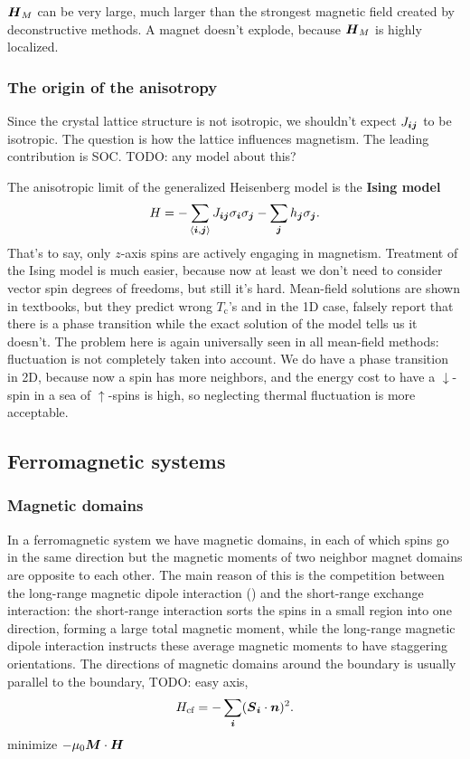 \documentclass[hyperref, a4paper]{article}
\newcommand*{\pair}[1]{\langle #1 \rangle}
\newcommand*{\concept}[1]{{\textbf{#1}}}
\newcommand*{\Tc}{T_{\text{c}}}
\begin{document}
$\vb*{H}_{M}$ can be very large,
much larger than the strongest magnetic field created 
by deconstructive methods.
A magnet doesn't explode, 
because $\vb*{H}_M$ is highly localized.

\subsubsection{The origin of the anisotropy}

Since the crystal lattice structure is not isotropic, 
we shouldn't expect $J_{\vb*{i} \vb*{j}}$ to be isotropic.
The question is how the lattice influences magnetism.
The leading contribution is SOC. TODO: any model about this?

The anisotropic limit of the generalized Heisenberg model is the \concept{Ising model}
\begin{equation}
    H = - \sum_{\pair{\vb*{i}, \vb*{j}}} J_{\vb*{i} \vb*{j}} \sigma_{\vb*{i}} \sigma_{\vb*{j}}
    - \sum_{\vb*{j}} h_{\vb*{j}} \sigma_{\vb*{j}}.
\end{equation}
That's to say, only $z$-axis spins are actively engaging in magnetism.
Treatment of the Ising model is much easier,
because now at least we don't need to consider vector spin degrees of freedoms,
but still it's hard. 
Mean-field solutions are shown in textbooks, 
but they predict wrong $\Tc$'s 
and in the 1D case, falsely report that there is a phase transition 
while the exact solution of the model tells us 
it doesn't. 
The problem here is again universally seen in all mean-field methods:
fluctuation is not completely taken into account. 
We do have a phase transition in 2D,
because now a spin has more neighbors, 
and the energy cost to have a $\downarrow$-spin 
in a sea of $\uparrow$-spins is high, 
so neglecting thermal fluctuation is more acceptable. 

\subsection{Ferromagnetic systems}

\subsubsection{Magnetic domains}

In a ferromagnetic system 
we have magnetic domains, 
in each of which spins go in the same direction 
but the magnetic moments of two neighbor magnet domains
are opposite to each other.
The main reason of this is the competition between 
the long-range magnetic dipole interaction ()
and the short-range exchange interaction:
the short-range interaction sorts the spins in a small region into one direction,
forming a large total magnetic moment,
while the long-range magnetic dipole interaction 
instructs these average magnetic moments to have staggering orientations.
The directions of magnetic domains around the boundary is usually parallel to the boundary,
TODO: easy axis, 
\begin{equation}
    H_{\text{cf}} = - \sum_{\vb*{i}} (\vb*{S}_{\vb*{i}} \cdot \vb*{n})^2.
\end{equation}
minimize $- \mu_0 \vb*{M} \cdot \vb*{H}$
\end{document}
